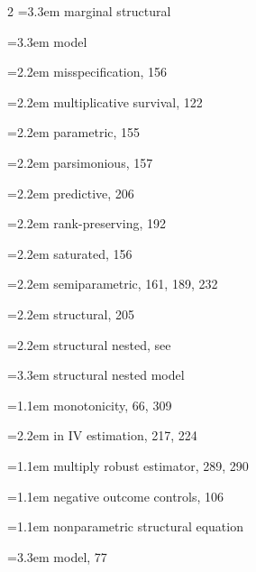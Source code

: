 \begin{multicols}{2}
\hspace*{2.2em}\hangindent=3.3em marginal structural\par
\hspace*{2.2em}\hangindent=3.3em model\par
\hspace*{1.1em}\hangindent=2.2em misspecification, 156\par
\hspace*{1.1em}\hangindent=2.2em multiplicative survival, 122\par
\hspace*{1.1em}\hangindent=2.2em parametric, 155\par
\hspace*{1.1em}\hangindent=2.2em parsimonious, 157\par
\hspace*{1.1em}\hangindent=2.2em predictive, 206\par
\hspace*{1.1em}\hangindent=2.2em rank-preserving, 192\par
\hspace*{1.1em}\hangindent=2.2em saturated, 156\par
\hspace*{1.1em}\hangindent=2.2em semiparametric, 161, 189, 232\par
\hspace*{1.1em}\hangindent=2.2em structural, 205\par
\hspace*{1.1em}\hangindent=2.2em structural nested, see\par
\hspace*{2.2em}\hangindent=3.3em structural nested model\par
\hangindent=1.1em monotonicity, 66, 309\par
\hspace*{1.1em}\hangindent=2.2em in IV estimation, 217, 224\par
\hangindent=1.1em multiply robust estimator, 289, 290\par
\hangindent=1.1em negative outcome controls, 106\par
\hangindent=1.1em nonparametric structural equation\par
\hspace*{2.2em}\hangindent=3.3em model, 77\par

\end{multicols}
